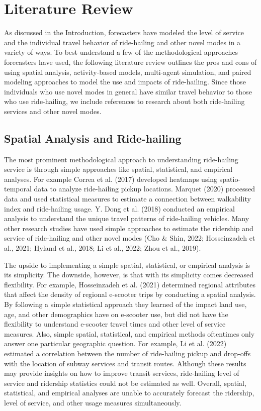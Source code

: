 \documentclass[fancy, masters]{byuthesis}
\begin{document}
\hypertarget{lit}{%
\chapter{Literature Review}\label{lit}}

As discussed in the Introduction, forecasters have modeled the level of service and the individual travel behavior of ride-hailing and other novel modes in a variety of ways. To best understand a few of the methodological approaches forecasters have used, the following literature review outlines the pros and cons of using spatial analysis, activity-based models, multi-agent simulation, and paired modeling approaches to model the use and impacts of ride-hailing. Since those individuals who use novel modes in general have similar travel behavior to those who use ride-hailing, we include references to research about both ride-hailing services and other novel modes.

\hypertarget{lit-simp}{%
\section{Spatial Analysis and Ride-hailing}\label{lit-simp}}

The most prominent methodological approach to understanding ride-hailing service is through simple approaches like spatial, statistical, and empirical analyses. For example Correa et al. (2017) developed heatmaps using spatio-temporal data to analyze ride-hailing pickup locations. Marquet (2020) processed data and used statistical measures to estimate a connection between walkability index and ride-hailing usage. Y. Dong et al. (2018) conducted an empirical analysis to understand the unique travel patterns of ride-hailing vehicles. Many other research studies have used simple approaches to estimate the ridership and service of ride-hailing and other novel modes (Cho \& Shin, 2022; Hosseinzadeh et al., 2021; Hyland et al., 2018; Li et al., 2022; Zhou et al., 2019).

The upside to implementing a simple spatial, statistical, or empirical analysis is its simplicity. The downside, however, is that with its simplicity comes decreased flexibility. For example, Hosseinzadeh et al. (2021) determined regional attributes that affect the density of regional e-scooter trips by conducting a spatial analysis. By following a simple statistical approach they learned of the impact land use, age, and other demographics have on e-scooter use, but did not have the flexibility to understand e-scooter travel times and other level of service measures. Also, simple spatial, statistical, and empirical methods oftentimes only answer one particular geographic question. For example, Li et al. (2022) estimated a correlation between the number of ride-hailing pickup and drop-offs with the location of subway services and transit routes. Although these results may provide insights on how to improve transit services, ride-hailing level of service and ridership statistics could not be estimated as well. Overall, spatial, statistical, and empirical analyses are unable to accurately forecast the ridership, level of service, and other usage measures simultaneously.
\end{document}
